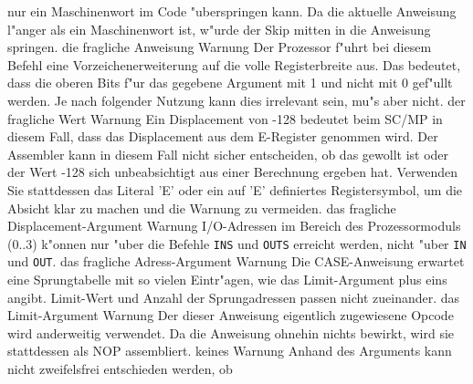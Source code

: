 \documentclass[12pt,a4paper,twoside]{report}
\begin{document}
\begin{description}
{                nur ein Maschinenwort im Code "uberspringen kann. Da
                die aktuelle Anweisung l"anger als ein Maschinenwort
                ist, w"urde der Skip mitten in die Anweisung springen.}
               {die fragliche Anweisung}
               {Warnung}
               {Der Prozessor f"uhrt bei diesem Befehl eine Vorzeichenerweiterung
                auf die volle Registerbreite aus.  Das bedeutet, dass
                die oberen Bits f"ur das gegebene Argument mit 1 und
                nicht mit 0 gef"ullt werden.  Je nach folgender Nutzung
                kann dies irrelevant sein, mu"s aber nicht.}
               {der fragliche Wert}
               {Warnung}
               {Ein Displacement von -128 bedeutet beim SC/MP in diesem Fall, dass
                das Displacement aus dem E-Register genommen wird.  Der Assembler
                kann in diesem Fall nicht sicher entscheiden, ob das gewollt ist
                oder der Wert -128 sich unbeabsichtigt aus einer Berechnung ergeben
                hat.  Verwenden Sie stattdessen das Literal 'E' oder ein auf 'E'
                definiertes Registersymbol, um die Absicht klar zu machen und die
                Warnung zu vermeiden.}
               {das fragliche Displacement-Argument}
               {Warnung}
               {I/O-Adressen im Bereich des Prozessormoduls (0..3) k"onnen nur
                "uber die Befehle {\tt INS} und {\tt OUTS} erreicht werden,
                nicht "uber {\tt IN} und {\tt OUT}.}
               {das fragliche Adress-Argument}
               {Warnung}
               {Die CASE-Anweisung erwartet eine Sprungtabelle mit so vielen
                Eintr"agen, wie das Limit-Argument plus eins angibt.  Limit-Wert
                und Anzahl der Sprungadressen passen nicht zueinander.}
               {das Limit-Argument}
               {Warnung}
               {Der dieser Anweisung eigentlich zugewiesene Opcode wird anderweitig
                verwendet.  Da die Anweisung ohnehin nichts bewirkt, wird sie stattdessen
                als NOP assembliert.}
               {keines}
               {Warnung}
               {Anhand des Arguments kann nicht zweifelsfrei entschieden werden, ob
}
\end{description}
\end{document}

